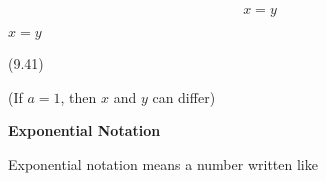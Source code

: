 \begin{description}
\begin{description}
{    \begin{equation}
    x=y\tag{9.41}
      \end{equation}
    }{%
    \setlength{\mymathboxwidth}{\columnwidth}
      \addtolength{\mymathboxwidth}{-48pt}
    \par\vspace{12pt}\noindent\begin{minipage}{\columnwidth}
    \parbox[t]{\mymathboxwidth}{\large$
    x=y$}\hfill
    \parbox[t]{48pt}{\raggedleft 
    (9.41)}
    \end{minipage}\vspace{12pt}\par
    }%
        (If $a=1$, then \begin{math}x\end{math} and \begin{math}y\end{math} can differ)
        \\\end{description}
	    \item[] \noindent\raggedright {\bf  Exponential Notation }\\\begin{description}\item{\hspace{.3cm}}\hspace{.3cm}
      \label{m38359*id62672}Exponential notation means a number written like\par 
      \label{m38359*id62677}\nopagebreak\noindent{}
\end{description}
\end{description}
